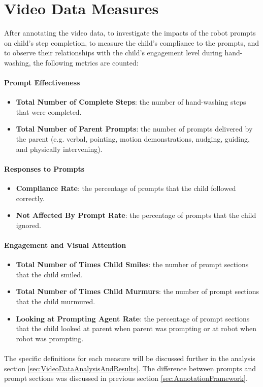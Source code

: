\section{Video Data Measures}
\label{sec:measures}
After annotating the video data, to investigate the impacts of the robot prompts on child's step completion, to measure the child's compliance to the prompts, and to observe their relationships with the child's engagement level during hand-washing, the following metrics are counted:

\paragraph{Prompt Effectiveness}
\begin{itemize}
	\item \textbf{Total Number of Complete Steps}: the number of hand-washing steps that were completed.
	\item \textbf{Total Number of Parent Prompts}: the number of prompts delivered by the parent (e.g. verbal, pointing, motion demonstrations, nudging, guiding, and physically intervening).
\end{itemize}

\paragraph{Responses to Prompts}
\begin{itemize}
	\item \textbf{Compliance Rate}: the percentage of prompts that the child followed correctly.
	\item \textbf{Not Affected By Prompt Rate}: the percentage of prompts that the child ignored.
\end{itemize}

\paragraph{Engagement and Visual Attention}
\begin{itemize}
	\item \textbf{Total Number of Times Child Smiles}: the number of prompt sections that the child smiled.
	\item \textbf{Total Number of Times Child Murmurs}: the number of prompt sections that the child murmured.
	\item \textbf{Looking at Prompting Agent Rate}: the percentage of prompt sections that the child looked at parent when parent was prompting or at robot when robot was prompting.
\end{itemize}

\paragraph{} %
The specific definitions for each measure will be discussed further in the analysis section \ref{sec:VideoDataAnalysisAndResults}.  The difference between prompts and prompt sections was discussed in previous section \ref{sec:AnnotationFramework}.